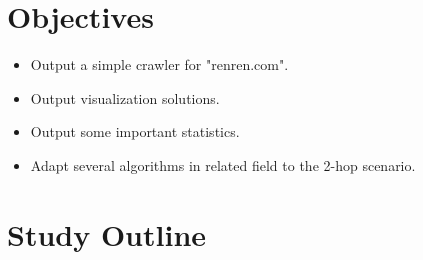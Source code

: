 \documentclass[11pt,a4paper]{article}
\begin{document}
\section{Objectives}

\begin{itemize}
	\item Output a simple crawler for "renren.com". 
	\item Output visualization solutions.
	\item Output some important statistics. 
	\item Adapt several algorithms in related field to the 2-hop scenario. 
\end{itemize}

\section{Study Outline}
\end{document}
